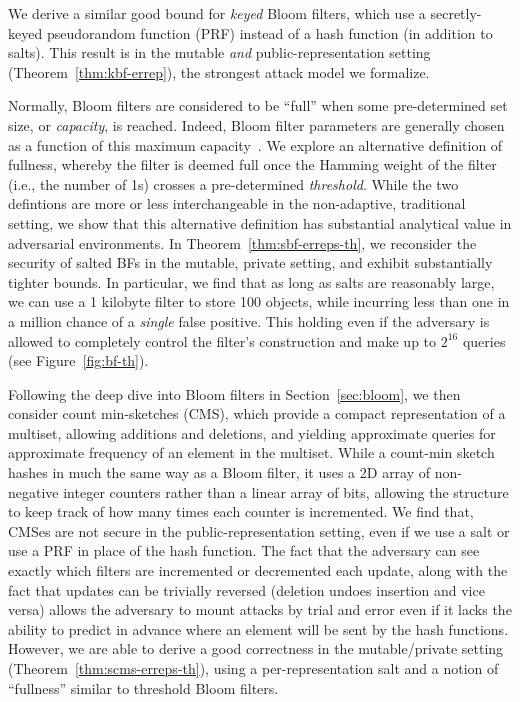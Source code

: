 We derive a similar good bound for \emph{keyed} Bloom filters, which use a
secretly-keyed pseudorandom function (PRF) instead of a hash function
(in addition to salts). This result is in the mutable \emph{and}
public-representation setting (Theorem~\ref{thm:kbf-errep}), the
strongest attack model we formalize.

Normally, Bloom filters are considered to be ``full'' when some
pre-determined set size, or
\emph{capacity}, is reached.  Indeed, Bloom filter parameters are generally chosen
as a function of this maximum capacity~\cite{kirsch2006less}.
%
We explore an alternative definition of fullness, whereby the filter is deemed full
once the Hamming weight of the filter (i.e., the number of 1s) crosses a
pre-determined \emph{threshold}.  While the two defintions are more or
less interchangeable in the non-adaptive, traditional setting, we show
that this alternative definition has substantial
analytical value in adversarial environments.  In
Theorem~\ref{thm:sbf-erreps-th}, we reconsider the security of salted
BFs in the mutable, private setting, and exhibit substantially tighter bounds. In
particular, we find that as long as salts are reasonably large, we can use
a 1 kilobyte filter to store 100 objects, while incurring less than one in a million
chance of a \emph{single} false positive.  This holding even if the adversary is allowed
to completely control the filter's construction and make up to $2^{16}$ queries
(see Figure~\ref{fig:bf-th}).


Following the deep dive into Bloom filters in Section~\ref{sec:bloom}, we then
consider count min-sketches (CMS), which provide a compact representation of a
multiset, allowing additions and deletions, and yielding approximate queries for
approximate frequency of an element in the multiset. While a count-min sketch
hashes in much the same way as a Bloom filter, it uses a 2D array of non-negative
integer counters rather than a linear array of bits, allowing the structure to
keep track of how many times each counter is incremented.
%
We find that, CMSes are not secure in the
public-representation setting, even if we use a salt or use a PRF in place of
the hash function. The fact that the adversary can see exactly which filters are
incremented or decremented each update, along with the fact that updates can be
trivially reversed (deletion undoes insertion and vice versa) allows the
adversary to mount attacks by trial and error even if it lacks the ability to
predict in advance where an element will be sent by the hash functions.
%
However, we are able to derive a good correctness in the mutable/private setting
(Theorem~\ref{thm:scms-erreps-th}), using a per-representation salt and a
notion of ``fullness'' similar to threshold Bloom filters.

